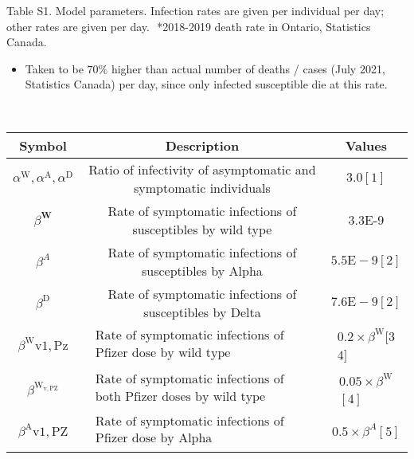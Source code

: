 \documentclass[10pt]{article}
\begin{document}
Table S1. Model parameters. Infection rates are given per individual per day; other rates are given per day.
​
*2018-2019 death rate in Ontario, Statistics Canada.
​
\begin{itemize}
  \item Taken to be $70 \%$ higher than actual number of deaths / cases (July 2021, Statistics Canada) per day, since only infected susceptible die at this rate.
\end{itemize}
​
\begin{center}
\begin{tabular}{|c|c|c|}
\hline
Symbol & Description & Values \\
\hline
$\alpha^{\mathrm{W}}, \alpha^{\mathrm{A}}, \alpha^{\mathrm{D}}$ & Ratio of infectivity of asymptomatic and symptomatic individuals & $3.0[1]$ \\
\hline
$\beta^{\mathbf{W}}$ & Rate of symptomatic infections of susceptibles by wild type & 3.3E-9 \\
\hline
$\beta^{A}$ & Rate of symptomatic infections of susceptibles by Alpha & $5.5 \mathrm{E}-9[2]$ \\
\hline
$\beta^{\mathrm{D}}$ & Rate of symptomatic infections of susceptibles by Delta & $7.6 \mathrm{E}-9[2]$ \\
\hline
$\beta^{\mathrm{W}} \mathrm{v1,Pz}$ & $\begin{array}{l}\text { Rate of symptomatic infections of individuals vaccinated with one } \\ \text { Pfizer dose by wild type }\end{array}$ & $\begin{array}{l}0.2 \times \beta^{\mathrm{W}}[3 \\ 4]\end{array}$ \\
\hline
$\beta^{\mathrm{W}_{\mathrm{v}, \mathrm{PZ}}}$ & $\begin{array}{l}\text { Rate of symptomatic infections of individuals vaccinated with } \\ \text { both Pfizer doses by wild type }\end{array}$ & $\begin{array}{l}0.05 \times \beta^{\mathrm{W}} \\ {[4]}\end{array}$ \\
\hline
$\beta^{\mathrm{A}} \mathrm{v} 1, \mathrm{PZ}$ & $\begin{array}{l}\text { Rate of symptomatic infections of individuals vaccinated with one } \\ \text { Pfizer dose by Alpha }\end{array}$ & $0.5 \times \beta^{A}[5]$ \\

\end{tabular}
\end{center}
\end{document}
